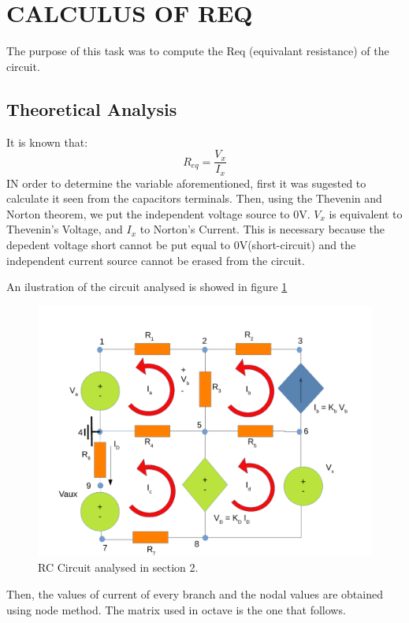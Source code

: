 \section{CALCULUS OF REQ}
The purpose of this task was to compute the Req (equivalant resistance) of the circuit.

\subsection{Theoretical Analysis}
It is known that:
\begin{equation}
R_{eq}=\frac{V_{x}}{I_{x}}
\end{equation}
IN order to determine the variable aforementioned, first it was sugested to calculate it seen from the capacitors terminals. Then, using the Thevenin and Norton theorem, we put the independent voltage source to 0V. $V_{x}$ is equivalent to Thevenin's Voltage, and $I_{x}$ to Norton's Current. This is necessary because the depedent voltage short cannot be put equal to 0V(short-circuit) and the independent current source cannot be erased from the circuit.
\par An ilustration of the circuit analysed is showed in figure \ref{sim2draw} 
\begin{figure}[h] \centering
\includegraphics[width=0.8\linewidth]{sim2draw.pdf}
\caption{RC Circuit analysed in section 2.}
\label{sim2draw}
\end{figure}
\par
Then, the values of current of  every branch and the nodal values are obtained using node method. The matrix used in octave is the one that follows.

